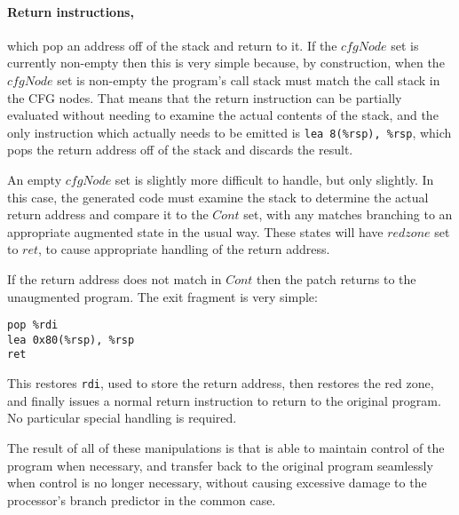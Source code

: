 \paragraph{Return instructions,} which pop an address off of the stack
and return to it.  If the $cfgNode$ set is
currently non-empty then this is very simple because, by construction,
when the $cfgNode$ set is non-empty the program's call stack must
match the call stack in the CFG nodes.  That means that the return
instruction can be partially evaluated without needing to examine the
actual contents of the stack, and the only instruction which actually
needs to be emitted is \verb|lea 8(%rsp), %rsp|, which pops the return
address off of the stack and discards the result.  


An empty $cfgNode$ set is slightly more difficult to handle, but only
slightly.  In this case, the generated code must examine the stack to
determine the actual return address and compare it to the $Cont$ set,
with any matches branching to an appropriate augmented state in the
usual way.  These states will have $redzone$ set to $ret$, to cause
appropriate handling of the return address.

If the return address does not match in $Cont$ then the patch returns
to the unaugmented program.  The exit fragment is very simple:

\begin{verbatim}
pop %rdi
lea 0x80(%rsp), %rsp
ret
\end{verbatim}

This restores \verb|rdi|, used to store the return address, then
restores the red zone, and finally issues a normal return instruction
to return to the original program.  No particular special handling is
required.


The result of all of these manipulations is that {\technique} is able
to maintain control of the program when necessary, and transfer back
to the original program seamlessly when control is no longer
necessary, without causing excessive damage to the processor's branch
predictor in the common case.

